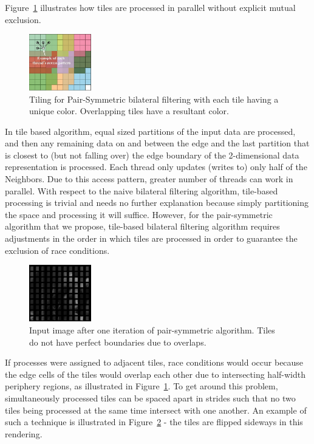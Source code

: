 \documentclass{IEEEtran}
\begin{document}
Figure~\ref{fig:Tiling-for-Pair-Symmetric} illustrates how tiles are processed in parallel without explicit mutual exclusion. 
\begin{figure}
\centering
\includegraphics[width=0.24\textwidth]{images/stackedtiles}
\caption{Tiling for Pair-Symmetric bilateral filtering with each tile having a unique color. Overlapping tiles have a resultant color.}
\vspace{0mm}
\label{fig:Tiling-for-Pair-Symmetric}
\end{figure}
In tile based algorithm, equal sized partitions of the input data are processed, and then any remaining data on and between the edge and the last partition that is closest to (but not falling over) the edge boundary of the 2-dimensional data representation is processed. Each thread only updates (writes to) only half of the Neighbors. Due to this access pattern, greater number of threads can work in parallel. 
With respect to the naive bilateral filtering algorithm, tile-based processing is trivial and needs no further explanation because simply partitioning the space and processing it will suffice. However, for the pair-symmetric algorithm that we propose, tile-based bilateral filtering algorithm requires adjustments in the order in which tiles are processed in order to guarantee the exclusion of race conditions. 

\begin{figure}
\includegraphics[width=0.24\textwidth]{images/lenatiles}
\caption{Input image after one iteration of pair-symmetric algorithm. Tiles do not have perfect boundaries due to overlaps.}
\label{fig:An-iteration-of}
\end{figure}
If processes were assigned to adjacent tiles, race conditions would occur because the edge cells of the tiles would overlap each other due to intersecting half-width periphery regions, as illustrated in Figure~\ref{fig:Tiling-for-Pair-Symmetric}. To get around this problem, simultaneously processed tiles can be spaced apart in strides such that no two tiles being processed at the same time intersect with one another. An example of such a technique is illustrated in Figure~\ref{fig:An-iteration-of} - the tiles are flipped sideways in this rendering. 
\end{document}
